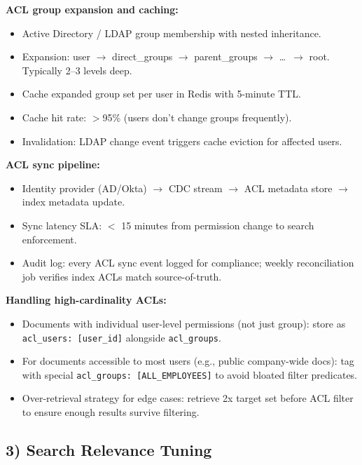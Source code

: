 \textbf{ACL group expansion and caching:}

\begin{itemize}
  \item Active Directory / LDAP group membership with nested inheritance.
  \item Expansion: user $\rightarrow$ direct\_groups $\rightarrow$ parent\_groups $\rightarrow$ \ldots\ $\rightarrow$ root. Typically 2--3 levels deep.
  \item Cache expanded group set per user in Redis with 5-minute TTL.
  \item Cache hit rate: $>$95\% (users don't change groups frequently).
  \item Invalidation: LDAP change event triggers cache eviction for affected users.
\end{itemize}

\textbf{ACL sync pipeline:}

\begin{itemize}
  \item Identity provider (AD/Okta) $\rightarrow$ CDC stream $\rightarrow$ ACL metadata store $\rightarrow$ index metadata update.
  \item Sync latency SLA: $<$ 15 minutes from permission change to search enforcement.
  \item Audit log: every ACL sync event logged for compliance; weekly reconciliation job verifies index ACLs match source-of-truth.
\end{itemize}

\textbf{Handling high-cardinality ACLs:}

\begin{itemize}
  \item Documents with individual user-level permissions (not just group): store as \texttt{acl\_users: [user\_id]} alongside \texttt{acl\_groups}.
  \item For documents accessible to most users (e.g., public company-wide docs): tag with special \texttt{acl\_groups: [ALL\_EMPLOYEES]} to avoid bloated filter predicates.
  \item Over-retrieval strategy for edge cases: retrieve 2x target set before ACL filter to ensure enough results survive filtering.
\end{itemize}

\subsection*{3) Search Relevance Tuning}

